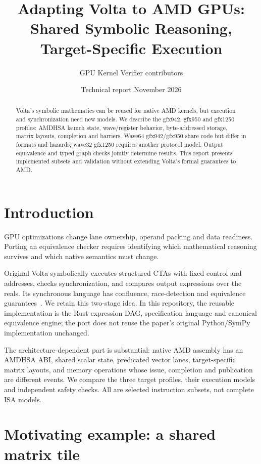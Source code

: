 \documentclass[10pt,letterpaper]{article}
\title{Adapting Volta to AMD GPUs:\\Shared Symbolic Reasoning, Target-Specific Execution}
\author{GPU Kernel Verifier contributors}
\date{Technical report \textemdash{} November 2026}
\begin{document}
\maketitle
\begin{abstract}
Volta's symbolic mathematics can be reused for native AMD kernels, but execution
and synchronization need new models. We describe the gfx942, gfx950 and gfx1250
profiles: AMDHSA launch state, wave/register behavior, byte-addressed storage,
matrix layouts, completion and barriers. Wave64 gfx942/gfx950 share code but
differ in formats and hazards; wave32 gfx1250 requires another protocol model.
Output equivalence and typed graph checks jointly determine results. This report
presents implemented subsets and validation without extending Volta's formal
guarantees to AMD.
\end{abstract}

\section{Introduction}

GPU optimizations change lane ownership, operand packing and data readiness.
Porting an equivalence checker requires identifying which mathematical reasoning
survives and which native semantics must change.

Original Volta symbolically executes structured CTAs with fixed control and
addresses, checks synchronization, and compares output expressions over the
reals. Its synchronous language has confluence, race-detection and equivalence
guarantees~\cite{volta}. We retain this two-stage idea. In this repository,
the reusable implementation is the Rust expression DAG, specification language
and canonical equivalence engine; the port does not reuse the paper's original
Python/SymPy implementation unchanged.

The architecture-dependent part is substantial: native AMD assembly has an
AMDHSA ABI, shared scalar state, predicated vector lanes, target-specific matrix
layouts, and memory operations whose issue, completion and publication are
different events. We compare the three target profiles, their execution models
and independent safety checks. All are selected instruction subsets, not
complete ISA models.

\section{Motivating example: a shared matrix tile}
\end{document}
